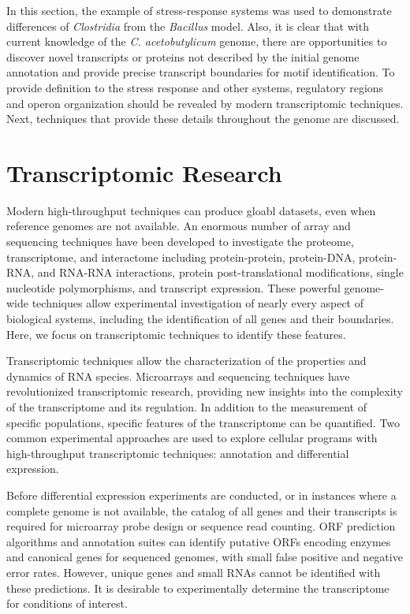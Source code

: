 In this section, the example of stress-response systems was used to demonstrate differences of \textit{Clostridia} from the \textit{Bacillus} model. Also, it is clear that with current knowledge of the \textit{C. acetobutylicum} genome, there are opportunities to discover novel transcripts or proteins not described by the initial genome annotation and provide precise transcript boundaries for motif identification. To provide definition to the stress response and other systems, regulatory regions and operon organization should be revealed by modern transcriptomic techniques. Next, techniques that provide these details throughout the genome are discussed.

\section{Transcriptomic Research}
Modern high-throughput techniques can produce gloabl datasets, even when reference genomes are not available.\cite{201} An enormous number of array and sequencing techniques have been developed to investigate the proteome, transcriptome, and interactome including protein-protein,\cite{141} protein-DNA,\cite{142,143,144} protein-RNA,\cite{145} and RNA-RNA interactions,\cite{146,147,149} protein post-translational modifications,\cite{149} single nucleotide polymorphisms,\cite{150} and transcript expression.\cite{151,152,153,154} These powerful genome-wide techniques allow experimental investigation of nearly every aspect of biological systems, including the identification of all genes and their boundaries. Here, we focus on transcriptomic techniques to identify these features. 

Transcriptomic techniques allow the characterization of the properties and dynamics of RNA species. Microarrays and sequencing techniques have revolutionized transcriptomic research, providing new insights into the complexity of the transcriptome\cite{152,154,155,156} and its regulation.\cite{157} In addition to the measurement of specific populations\cite{195,196}, specific features of the transcriptome can be quantified.\cite{194} Two common experimental approaches are used to explore cellular programs with high-throughput transcriptomic techniques: annotation and differential expression.

Before differential expression experiments are conducted, or in instances where a complete genome is not available, the catalog of all genes and their transcripts is required for microarray probe design or sequence read counting. ORF prediction algorithms\cite{158,159} and annotation suites\cite{160,161} can identify putative ORFs encoding enzymes and canonical genes for sequenced genomes, with small false positive and negative error rates. However, unique genes and small RNAs cannot be identified with these predictions. It is desirable to experimentally determine the transcriptome for conditions of interest.

